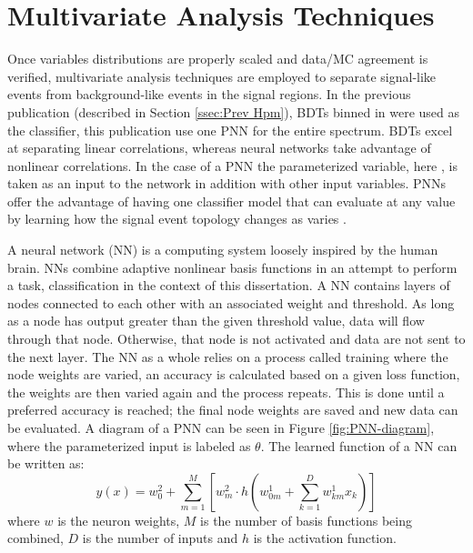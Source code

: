 	\section{Multivariate Analysis Techniques}\label{sec:mva}
		Once variables distributions are properly scaled and data/MC agreement is verified, multivariate analysis techniques are employed to separate signal-like events from background-like events in the signal regions. In the previous publication (described in Section \ref{ssec:Prev Hpm}), BDTs binned in \mHpm were used as the classifier, this publication use one PNN for the entire \mHpm spectrum. BDTs excel at separating linear correlations, whereas neural networks take advantage of nonlinear correlations. In the case of a PNN the parameterized variable, here \mHpm, is taken as an input to the network in addition with other input variables. PNNs offer the advantage of having one classifier model that can evaluate at any \mHpm value by learning how the signal event topology changes as \mHpm varies \cite{PNN}.

		A neural network (NN) is a computing system loosely inspired by the human brain. NNs combine adaptive nonlinear basis functions in an attempt to perform a task, classification in the context of this dissertation. A NN contains layers of nodes connected to each other with an associated weight and threshold. As long as a node has output greater than the given threshold value, data will flow through that node. Otherwise, that node is not activated and data are not sent to the next layer. The NN as a whole relies on a process called training where the node weights are varied, an accuracy is calculated based on a given loss function, the weights are then varied again and the process repeats. This is done until a preferred accuracy is reached; the final node weights are saved and new data can be evaluated. A diagram of a PNN can be seen in Figure \ref{fig:PNN-diagram}, where the parameterized input is labeled as $\theta$. The learned function of a NN can be written as:
		\begin{equation}
		y(x) = w_{0}^{2} + \sum^{M}_{m=1}[ w^{2}_{m} \cdot h (w_{0m}^{1} + \sum^{D}_{k=1} w^{1}_{km} x_{k}  )]
		\end{equation}
		where $w$ is the neuron weights, $M$ is the number of basis functions being combined, $D$ is the number of inputs and $h$ is the activation function.


